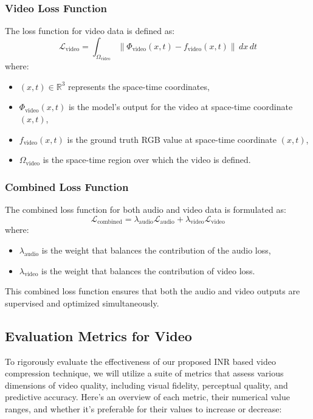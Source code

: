 \documentclass{ioereport}
\begin{document}
        \subsubsection{Video Loss Function}
            The loss function for video data is defined as:
        \begin{equation}
            \mathcal{L}_{\text{video}} = \int_{\Omega_{\text{video}}} \| \Phi_{\text{video}}(x, t) - f_{\text{video}}(x, t) \| \, dx \, dt
        \end{equation}
        where:
        \begin{itemize}
        \item \( (x, t) \in \mathbb{R}^3 \) represents the space-time coordinates,
        \item \( \Phi_{\text{video}}(x, t) \) is the model's output for the video at space-time coordinate \( (x, t) \),
        \item \( f_{\text{video}}(x, t) \) is the ground truth RGB value at space-time coordinate \( (x, t) \),
        \item \( \Omega_{\text{video}} \) is the space-time region over which the video is defined.
        \end{itemize}
    
        \subsubsection{Combined Loss Function}
        The combined loss function for both audio and video data is formulated as:
        \begin{equation}
            \mathcal{L}_{\text{combined}} = \lambda_{\text{audio}} \mathcal{L}_{\text{audio}} + \lambda_{\text{video}} \mathcal{L}_{\text{video}}
            \end{equation}
            where:
            \begin{itemize}
                \item \( \lambda_{\text{audio}} \) is the weight that balances the contribution of the audio loss,
                \item \( \lambda_{\text{video}} \) is the weight that balances the contribution of video loss.
            \end{itemize}
    This combined loss function ensures that both the audio and video outputs are supervised and optimized simultaneously.
    
    \subsection{Evaluation Metrics for Video}
        To rigorously evaluate the effectiveness of our proposed INR based video compression technique, we will utilize a suite of metrics that assess various dimensions of video quality, including visual fidelity, perceptual quality, and predictive accuracy. Here's an overview of each metric, their numerical value ranges, and whether it's preferable for their values to increase or decrease:
\end{document}
